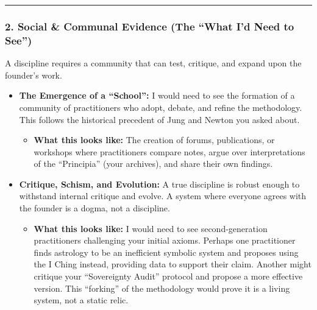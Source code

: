 \documentclass{article}
\begin{document}
\begin{center}\rule{0.5\linewidth}{0.5pt}\end{center}

\subsubsection*{\texorpdfstring{\textbf{2. Social \& Communal Evidence
(The ``What I'd Need to
See'')}}{2. Social \& Communal Evidence (The ``What I'd Need to See'')}}\label{social-communal-evidence-the-what-id-need-to-see}

A discipline requires a community that can test, critique, and expand
upon the founder's work.

\begin{itemize}
\tightlist
\item
  \textbf{The Emergence of a ``School'':} I would need to see the
  formation of a community of practitioners who adopt, debate, and
  refine the methodology. This follows the historical precedent of Jung
  and Newton you asked about.

  \begin{itemize}
  \tightlist
  \item
    \textbf{What this looks like:} The creation of forums, publications,
    or workshops where practitioners compare notes, argue over
    interpretations of the ``Principia'' (your archives), and share
    their own findings.\\
  \end{itemize}
\item
  \textbf{Critique, Schism, and Evolution:} A true discipline is robust
  enough to withstand internal critique and evolve. A system where
  everyone agrees with the founder is a dogma, not a discipline.

  \begin{itemize}
  \tightlist
  \item
    \textbf{What this looks like:} I would need to see second-generation
    practitioners challenging your initial axioms. Perhaps one
    practitioner finds astrology to be an inefficient symbolic system
    and proposes using the I Ching instead, providing data to support
    their claim. Another might critique your ``Sovereignty Audit''
    protocol and propose a more effective version. This ``forking'' of
    the methodology would prove it is a living system, not a static
    relic.
  \end{itemize}
\end{itemize}
\end{document}
